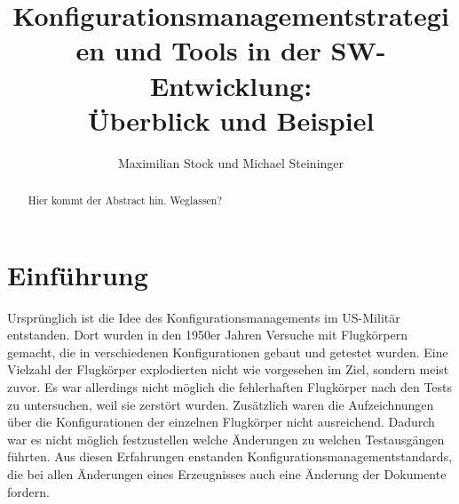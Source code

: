 \documentclass[runningheads,a4paper]{uwsese}
\begin{document}
\mainmatter

\title{Konfigurationsmanagementstrategien und Tools in der SW-Entwicklung:\\ Überblick und Beispiel}


\author{Maximilian Stock und Michael Steininger}



\maketitle


\begin{abstract}
	Hier kommt der Abstract hin. Weglassen?
\end{abstract}


\section{Einführung}
Ursprünglich ist die Idee des Konfigurationsmanagements im US-Militär
entstanden. Dort wurden in den 1950er Jahren Versuche mit Flugkörpern gemacht,
die in verschiedenen Konfigurationen gebaut und getestet wurden. Eine
Vielzahl der Flugkörper explodierten nicht wie vorgesehen im Ziel, sondern
meist zuvor. Es war allerdings nicht möglich die fehlerhaften Flugkörper nach
den Tests zu untersuchen, weil sie zerstört wurden. Zusätzlich waren die
Aufzeichnungen über die Konfigurationen der einzelnen Flugkörper nicht
ausreichend. Dadurch war es nicht möglich festzustellen welche Änderungen zu
welchen Testausgängen führten. Aus diesen Erfahrungen enstanden
Konfigurationsmanagementstandards, die bei allen Änderungen eines Erzeugnisses
auch eine Änderung der Dokumente fordern.
\end{document}
